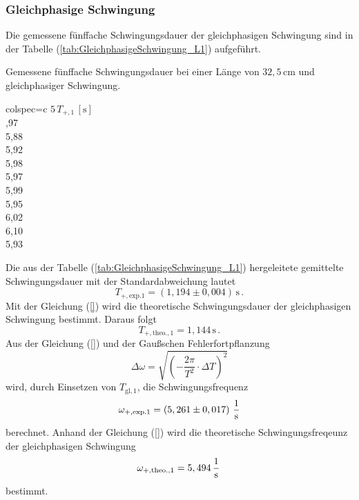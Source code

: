 \subsubsection{Gleichphasige Schwingung}
\label{sec:GleichphasigeSchwingung_KuresPendel}
Die gemessene fünffache Schwingungsdauer der gleichphasigen Schwingung sind in der Tabelle (\ref{tab:GleichphasigeSchwingung_L1}) aufgeführt.
\begin{table}[H]
  \centering
  \caption{Gemessene fünffache Schwingungsdauer bei einer Länge von $32,5\, \unit{\centi\meter}$ und gleichphasiger Schwingung.}
  \label{tab:GleichphasigeSchwingung_L1}
  \begin{tblr}{colspec={c}}
      \toprule
      $5\, T_{+, 1}\,\left[\unit{\second}\right]$\\
      ,97 \\
      5,88 \\
      5,92 \\
      5,98 \\
      5,97 \\
      5,99 \\
      5,95 \\
      6,02 \\
      6,10 \\
      5,93 \\
      \bottomrule
  \end{tblr}
\end{table}
Die aus der Tabelle (\ref{tab:GleichphasigeSchwingung_L1}) hergeleitete gemittelte Schwingungsdauer mit der Standardabweichung lautet
$$T_{+,\text{exp.} 1} = \left( 1,194 \pm 0,004 \right)\,\unit{\second}\,.$$
Mit der Gleichung (\ref{}) wird die theoretische Schwingungsdauer der gleichphasigen Schwingung bestimmt. Daraus folgt
$$T_{+, \text{theo.}, 1} = 1,144\,\unit{\second}\,.$$
Aus der Gleichung (\ref{}) und der Gaußschen Fehlerfortpflanzung 
$$\Delta \omega = \sqrt{\left(-\frac{2 \pi}{T^{2}}\cdot \Delta T \right)^{2}}$$
wird, durch Einsetzen von $T_{\text{gl}, 1}$, die Schwingungsfrequenz
$$\omega_{+,\text{exp.} 1} =  \left( 5,261 \pm 0,017 \right)\,\unit[per-mode=fraction]{\per \second}$$ berechnet. 
Anhand der Gleichung (\ref{}) wird die theoretische Schwingungsfreqeunz der gleichphasigen Schwingung 
$$\omega_{+, \text{theo.}, 1} = 5,494\,\unit[per-mode=fraction]{\per \second}\,$$ bestimmt.
%
%
